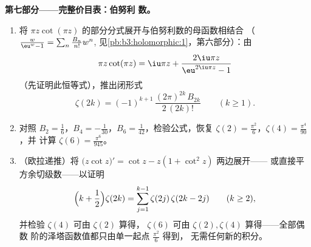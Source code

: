 \begin{problem}
\begin{enumerate}[resume]
\end{enumerate}
\medskip
\noindent\textbf{第七部分——完整价目表：伯努利
数。}
\begin{enumerate}[resume]
  \item 将 $\pi
        z\cot(\pi z)$ 的部分分式展开与伯努利数的母函数相结合
        （$\frac{w}{\eu^w - 1} =
        \sum_n\frac{B_n}{n!}w^n$,
        见\cref{pb:b3:holomorphic:1}，第六部分）：由
        \[
        \pi z\cot(\pi z) = \iu\pi z +
        \frac{2\iu\pi z}{\eu^{2\iu\pi z} - 1}
        \]
        （先证明此恒等式），推出闭形式
        \[
        \zeta(2k) = (-1)^{k+1}\,
        \frac{(2\pi)^{2k}\,B_{2k}}{2\,(2k)!}
        \qquad (k \geq 1).
        \]
  \item 对照 $B_2 = \frac16$，$B_4 =
        -\frac1{30}$，$B_6 = \frac1{42}$，检验公式，恢复 $\zeta(2) =
        \frac{\pi^2}6$，$\zeta(4) = \frac{\pi^4}{90}$，并
        计算 $\zeta(6) = \frac{\pi^6}{945}$。
  \item （欧拉递推）将
        $\bigl(z\cot z\bigr)' = \cot z - z(1 + \cot^2z)$ 两边展开——
        或直接平方余切级数——以证明
        \[
        \Bigl(k + \frac12\Bigr)\zeta(2k) =
        \sum_{j=1}^{k-1}\zeta(2j)\,\zeta(2k - 2j)
        \qquad (k \geq 2),
        \]
        并检验 $\zeta(4)$ 可由 $\zeta(2)$ 算得，
        $\zeta(6)$ 可由 $\zeta(2), \zeta(4)$ 算得——全部偶数
        阶的泽塔函数值都只由单一起点 $\frac{\pi^2}6$ 得到，
        无需任何新的积分。
\end{enumerate}
\end{problem}
